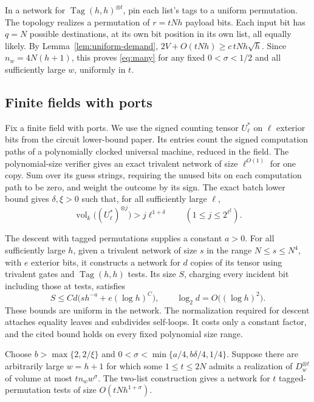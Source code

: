 In a network for \(\operatorname{Tag}(h,h)^{\otimes t}\), pin each
list's tags to a uniform permutation. The topology realizes a permutation
of \(r=tNh\) payload bits. Each input bit has \(q=N\) possible
destinations, at its own bit position in its own list, all equally
likely. By Lemma~\ref{lem:uniform-demand},
\(2V+O(tNh)\ge c\,tNh\sqrt h\). Since \(n_w=4N(h+1)\), this proves
\eqref{eq:many} for any fixed \(0<\sigma<1/2\) and all sufficiently
large \(w\), uniformly in \(t\).

\subsection{Finite fields with ports}

Fix a finite field with ports. We use the signed counting tensor
\(U_\ell^*\) on \(\ell\) exterior bits from the circuit lower-bound
paper. Its entries count the signed computation paths of a polynomially
clocked universal machine, reduced in the field. The polynomial-size
verifier gives an exact trivalent network of size \(\ell^{O(1)}\) for
one copy. Sum over its guess strings, requiring the unused bits on
each computation path to be zero, and weight the outcome by its sign. The exact batch lower bound
\cite[Theorem~]{oaP} gives \(\delta,\xi>0\)
such that, for all sufficiently large \(\ell\),
\[
       \operatorname{vol}_k\bigl((U_\ell^*)^{\otimes j}\bigr)
              >j\ell^{1+\delta}
       \qquad (1\le j\le 2^{\ell^\xi}).
\]

The descent with tagged permutations
\cite[Proposition~]{oaG} supplies a
constant \(a>0\). For all sufficiently large \(h\), given a trivalent
network of size \(s\) in the range \(N\le s\le N^4\), with \(e\)
exterior bits, it constructs a network for \(d\) copies of its tensor
using trivalent gates and \(\operatorname{Tag}(h,h)\) tests. Its size
\(S\), charging every incident bit including those at tests, satisfies
\[
            S\le C d\bigl(sh^{-a}+e(\log h)^C\bigr),
           \qquad \log_2 d=O\bigl((\log h)^2\bigr).
\]
These bounds are uniform in the network. The normalization required
for descent attaches equality leaves and subdivides self-loops. It
costs only a constant factor, and the cited bound holds on every fixed
polynomial size range.

Choose \(b>\max\{2,2/\xi\}\) and
\(0<\sigma<\min\{a/4,b\delta/4,1/4\}\). Suppose there are arbitrarily
large \(w=h+1\) for which some \(1\le t\le 2N\) admits a realization
of \(D_w^{\otimes t}\) of volume at most \(tn_w w^\sigma\).
The two-list construction gives a network for \(t\) tagged-permutation
tests of size \(O(tNh^{1+\sigma})\).

